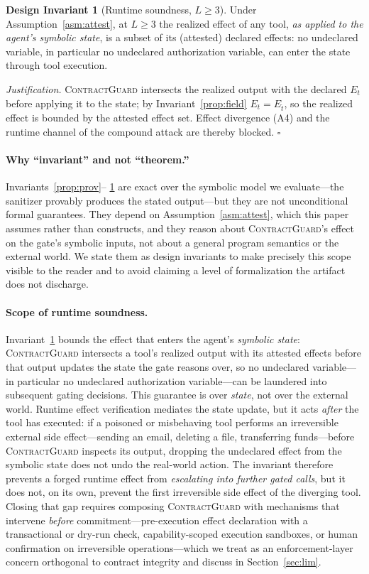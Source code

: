 \documentclass[conference,onecolumn]{IEEEtran}
\theoremstyle{definition}
\newtheorem{invariant}{Design Invariant}
\newcommand{\cg}{\textsc{ContractGuard}}
\begin{document}
\begin{invariant}[Runtime soundness, $L\geq 3$]
\label{prop:runtime}
Under Assumption~\ref{asm:attest}, at $L\geq 3$ the realized effect of any tool,
\emph{as applied to the agent's symbolic state}, is a subset of its (attested)
declared effects: no undeclared variable, in particular no undeclared
authorization variable, can enter the state through tool execution.
\end{invariant}
\noindent\emph{Justification.} \cg{} intersects the realized output with the
declared $E_t$ before applying it to the state; by Invariant~\ref{prop:field}
$E_t=E_{\hat t}$, so the realized effect is bounded by the attested effect set.
Effect divergence (A4) and the runtime channel of the compound attack are thereby
blocked. $\square$

\paragraph{Why ``invariant'' and not ``theorem.''} Invariants~\ref{prop:prov}--%
\ref{prop:runtime} are exact over the symbolic model we evaluate---the sanitizer
provably produces the stated output---but they are not unconditional formal
guarantees. They depend on Assumption~\ref{asm:attest}, which this paper assumes
rather than constructs, and they reason about \cg's effect on the gate's
symbolic inputs, not about a general program semantics or the external world. We
state them as design invariants to make precisely this scope visible to the
reader and to avoid claiming a level of formalization the artifact does not
discharge.

\paragraph{Scope of runtime soundness.} Invariant~\ref{prop:runtime} bounds the
effect that enters the agent's \emph{symbolic state}: \cg{} intersects a tool's
realized output with its attested effects before that output updates the state
the gate reasons over, so no undeclared variable---in particular no undeclared
authorization variable---can be laundered into subsequent gating decisions. This
guarantee is over \emph{state}, not over the external world. Runtime effect
verification mediates the state update, but it acts \emph{after} the tool has
executed: if a poisoned or misbehaving tool performs an irreversible external
side effect---sending an email, deleting a file, transferring funds---before
\cg{} inspects its output, dropping the undeclared effect from the symbolic state
does not undo the real-world action. The invariant therefore prevents a forged
runtime effect from \emph{escalating into further gated calls}, but it does not,
on its own, prevent the first irreversible side effect of the diverging tool.
Closing that gap requires composing \cg{} with mechanisms that intervene
\emph{before} commitment---pre-execution effect declaration with a transactional
or dry-run check, capability-scoped execution sandboxes, or human confirmation on
irreversible operations---which we treat as an enforcement-layer concern
orthogonal to contract integrity and discuss in Section~\ref{sec:lim}.
\end{document}
